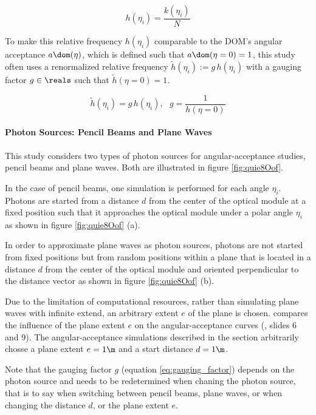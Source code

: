 \begin{equation}
  h(\eta_i) = \frac{k(\eta_i)}{N}
\end{equation}

To make this relative frequency $h(\eta_i)$ comparable to the DOM's angular acceptance $a\dom(\eta)$, which is defined such that $a\dom(\eta = 0) = 1$, this study often uses a renormalized relative frequency $\tilde{h}(\eta_i):=g\,h(\eta_i)$ with a gauging factor $g\in\reals$ such that $\tilde{h}(\eta = 0) = 1$.

\begin{equation}
  \tilde{h}(\eta_i) = g\,h(\eta_i), \ \ \
  g = \frac{1}{h(\eta = 0)}
  \label{eq:gauging_factor}
\end{equation}


\paragraph{Photon Sources: Pencil Beams and Plane Waves}
This study considers two types of photon sources for angular-acceptance studies, pencil beams and plane waves. Both are illustrated in figure \ref{fig:quie8Oof}.

In the case of pencil beams, one simulation is performed for each angle $\eta_i$. Photons are started from a distance $d$ from the center of the optical module at a fixed position such that it approaches the optical module under a polar angle $\eta_i$ as shown in figure \ref{fig:quie8Oof} (a).

In order to approximate plane waves as photon sources, photons are not started from fixed positions but from random positions within a plane that is located in a distance $d$ from the center of the optical module and oriented perpendicular to the distance vector as shown in figure \ref{fig:quie8Oof} (b).

Due to the limitation of computational resources, rather than simulating plane waves with infinite extend, an arbitrary extent $e$ of the plane is chosen.  \cite{martindardupdate} compares the influence of the plane extent $e$ on the angular-acceptance curves (\cite{martindardupdate}, slides 6 and 9). The angular-acceptance simulations described in the section arbitrarily chosse a plane extent $e = 1\m$ and a start distance $d = 1\m$.

Note that the gauging factor $g$ (equation \ref{eq:gauging_factor}) depends on the photon source and needs to be redetermined when chaning the photon source, that is to say when switching between pencil beams, plane waves, or when changing the distance $d$, or the plane extent $e$.

